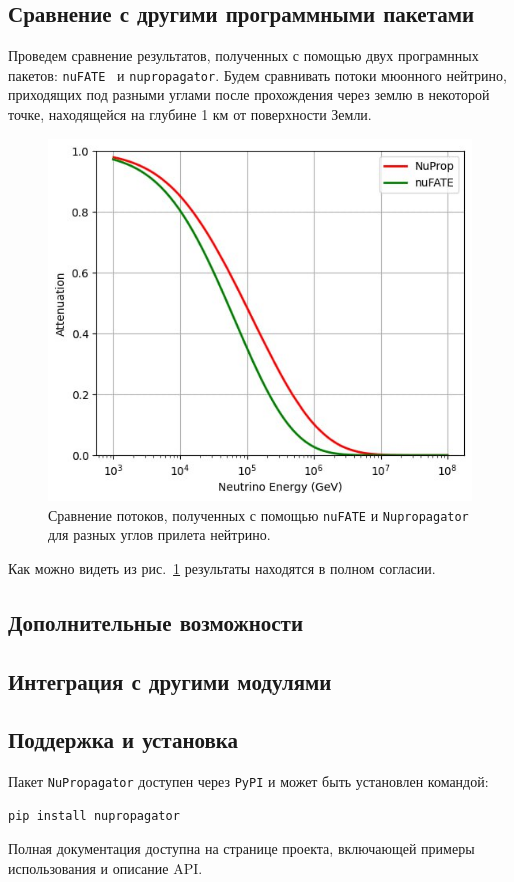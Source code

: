 \subsection{Сравнение с другими программными пакетами}
 Проведем сравнение результатов, полученных с помощью двух програмнных пакетов: \texttt{nuFATE}~\cite{Vincent_2017} и \texttt{nupropagator}. Будем сравнивать потоки мюонного нейтрино, приходящих под разными углами после прохождения через землю в некоторой точке, находящейся на глубине 1 км от поверхности Земли.
\begin{figure}[!h]
\centering
\includegraphics[width=\linewidth]{images/NuProp/compare_fluxes.jpg}
\caption{Сравнение потоков, полученных с помощью \texttt{nuFATE} и \texttt{Nupropagator} для разных углов прилета нейтрино.}
\label{fig:flux_compare}
\end{figure}
Как можно видеть из рис.~\ref{fig:flux_compare} результаты находятся в полном согласии. 



\subsection{Дополнительные возможности}

\subsection{Интеграция с другими модулями}

\subsection{Поддержка и установка}

Пакет \texttt{NuPropagator} доступен через \texttt{PyPI} и может быть установлен командой:
\begin{verbatim}
pip install nupropagator
\end{verbatim}
Полная документация доступна на странице проекта, включающей примеры использования и описание API.
